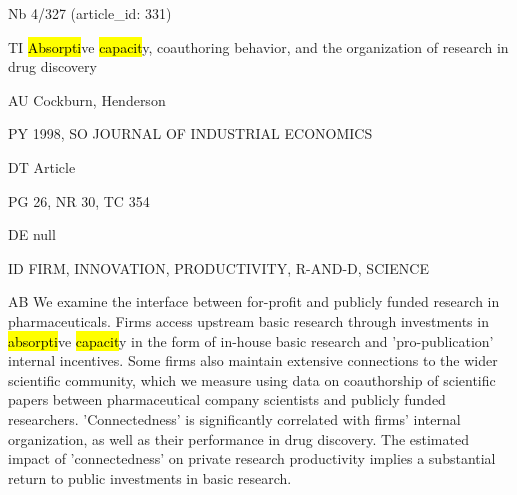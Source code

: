 \documentclass[a4paper]{article}
\begin{document}
\vspace*{-2cm}
Nb \tabto{0cm}4/327 (article\_id: 331)\par
TI \tabto{0cm}\hl{Absorpti}ve \hl{capacit}y, coauthoring behavior, and the organization of research in drug discovery\par
AU \tabto{0cm}Cockburn, Henderson\par
PY \tabto{0cm}1998, SO JOURNAL OF INDUSTRIAL ECONOMICS\par
DT \tabto{0cm}Article\par
PG \tabto{0cm}26, NR 30, TC 354\par
DE \tabto{0cm}null\par
ID \tabto{0cm}FIRM, INNOVATION, PRODUCTIVITY, R-AND-D, SCIENCE\par
AB \tabto{0cm}We examine the interface between for-profit and publicly funded research in pharmaceuticals. Firms access upstream basic research through investments in \hl{absorpti}ve \hl{capacit}y in the form of in-house basic research and 'pro-publication' internal incentives. Some firms also maintain extensive connections to the wider scientific community, which we measure using data on coauthorship of scientific papers between pharmaceutical company scientists and publicly funded researchers. 'Connectedness' is significantly correlated with firms' internal organization, as well as their performance in drug discovery. The estimated impact of 'connectedness' on private research productivity implies a substantial return to public investments in basic research.\par
\clearpage
\end{document}
